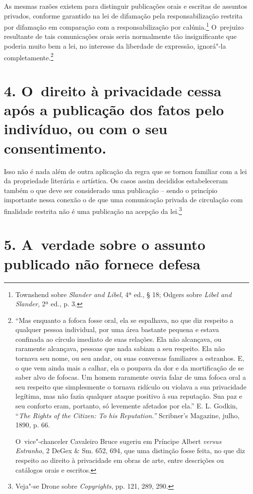 As mesmas razões existem para distinguir publicações orais e escritas de
assuntos privados, conforme garantido na lei de difamação pela
responsabilização restrita por difamação em comparação com a
responsabilização por calúnia.\footnote{Townshend sobre \emph{Slander
  and Libel}, 4ª ed., § 18; Odgers sobre \emph{Libel and Slander}, 2ª
  ed., p. 3.} O~prejuízo resultante de tais comunicações orais seria
normalmente tão insignificante que poderia muito bem a lei, no interesse
da liberdade de expressão, ignorá"-la completamente.\footnote{``Mas
  enquanto a fofoca fosse oral, ela se espalhava, no que diz respeito a
  qualquer pessoa individual, por uma área bastante pequena e estava
  confinada ao círculo imediato de suas relações. Ela não alcançava, ou
  raramente alcançava, pessoas que nada sabiam a seu respeito. Ela não
  tornava seu nome, ou seu andar, ou suas conversas familiares a
  estranhos. E, o que vem ainda mais a calhar, ela o poupava da dor e da
  mortificação de se saber alvo de fofocas. Um homem raramente ouvia
  falar de uma fofoca oral a seu respeito que simplesmente o tornava
  ridículo ou violava a sua privacidade legítima, mas não fazia qualquer
  ataque positivo à sua reputação. Sua paz e seu conforto eram,
  portanto, só levemente afetados por ela.'' E. L. Godkin, ``\emph{The
  Rights of the Citizen: To his Reputation.''} Scribner's Magazine,
  julho, 1890, p. 66.

  O~vice"-chanceler Cavaleiro Bruce sugeriu em Príncipe Albert
  \emph{versus Estranho}, 2 DeGex \& Sm. 652, 694, que uma distinção
  fosse feita, no que diz respeito ao direito à privacidade em obras de
  arte, entre descrições ou catálogos orais e escritos.}

\section{4. O~direito à privacidade cessa após a publicação dos fatos
pelo indivíduo, ou com o seu consentimento.}

Isso não é nada além de outra aplicação da regra que se tornou familiar
com a lei da propriedade literária e artística. Os casos assim decididos
estabeleceram também o que deve ser considerado uma publicação -- sendo
o princípio importante nessa conexão o de que uma comunicação privada de
circulação com finalidade restrita não é uma publicação na acepção da
lei.\footnote{Veja"-se Drone sobre \emph{Copyrights}, pp. 121, 289, 290.}

\section{5. A~verdade sobre o assunto publicado não fornece defesa}

